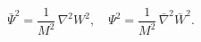 \begin{equation}
{\bar \Psi}^2 = \frac{1}{M^2} \,\nabla^2 {W^2}, \quad \Psi^2 =
\frac{1}{M^2} \,{\bar \nabla}^2 {\bar W}^2.
\end{equation}

